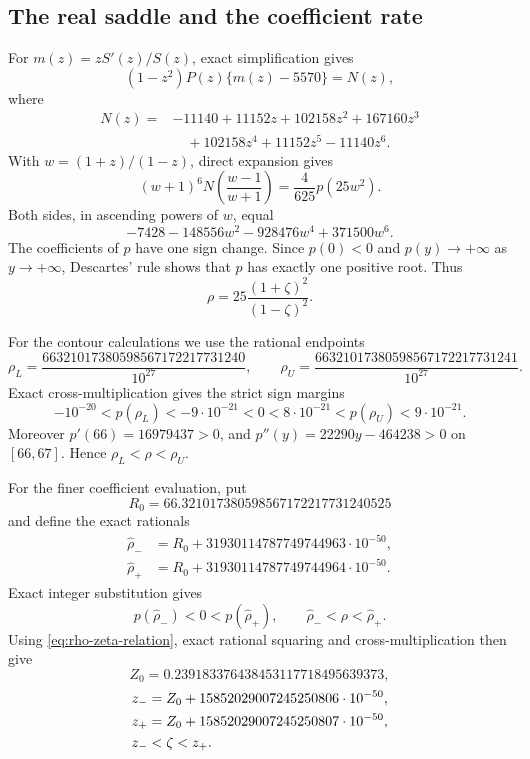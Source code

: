 \documentclass[11pt,reqno,letterpaper]{amsart}
\numberwithin{equation}{section}
\theoremstyle{definition}
\theoremstyle{remark}
\begin{document}
\subsection{The real saddle and the coefficient rate}
\label{subsec:real-saddle-calculations}

For \(m(z)=zS'(z)/S(z)\), exact simplification gives
\begin{equation}\label{eq:coefficient-saddle-numerator}
 (1-z^2)P(z)\{m(z)-5570\}=N(z),
\end{equation}
where
\[
 \begin{split}
 N(z)={}&-11140+11152z+102158z^2+167160z^3\\
        &\quad+102158z^4+11152z^5-11140z^6.
 \end{split}
\]
With \(w=(1+z)/(1-z)\), direct expansion gives
\begin{equation}\label{eq:N-to-stationary-cubic}
 (w+1)^6N\left(\frac{w-1}{w+1}\right)
 =\frac4{625}p(25w^2).
\end{equation}
Both sides, in ascending powers of \(w\), equal
\[
 -7428-148556w^2-928476w^4+371500w^6.
\]
The coefficients of \(p\) have one sign change.  Since \(p(0)<0\) and
\(p(y)\to+\infty\) as \(y\to+\infty\), Descartes' rule shows that
\(p\) has exactly one positive root.  Thus
\begin{equation}\label{eq:rho-zeta-relation}
 \rho=25\frac{(1+\zeta)^2}{(1-\zeta)^2}.
\end{equation}

For the contour calculations we use the rational endpoints
\[
 \rho_L=\frac{66321017380598567172217731240}{10^{27}},
 \qquad
 \rho_U=\frac{66321017380598567172217731241}{10^{27}}.
\]
Exact cross-multiplication gives the strict sign margins
\[
 -10^{-20}<p(\rho_L)<-9\cdot10^{-21}<0
 <8\cdot10^{-21}<p(\rho_U)<9\cdot10^{-21}.
\]
Moreover \(p'(66)=16979437>0\), and
\(p''(y)=22290y-464238>0\) on \([66,67]\).  Hence
\(\rho_L<\rho<\rho_U\).

For the finer coefficient evaluation, put
\[
 R_0=66.321017380598567172217731240525
\]
and define the exact rationals
\begin{align*}
 \widehat\rho_-&=R_0+
 31930114787749744963\cdot10^{-50},\\
 \widehat\rho_+&=R_0+
 31930114787749744964\cdot10^{-50}.
\end{align*}
Exact integer substitution gives
\begin{equation}\label{eq:rho-fine-isolation}
 p(\widehat\rho_-)<0<p(\widehat\rho_+),\qquad
 \widehat\rho_-<\rho<\widehat\rho_+.
\end{equation}
Using \eqref{eq:rho-zeta-relation}, exact rational squaring and
cross-multiplication then give
\[
 Z_0=0.239183376438453117718495639373,
\]
\begin{align}
 z_-&=Z_0+15852029007245250806\cdot10^{-50},\notag\\
 z_+&=Z_0+15852029007245250807\cdot10^{-50},\notag\\
 z_-&<\zeta<z_+.\label{eq:zeta-isolation}
\end{align}
\end{document}
